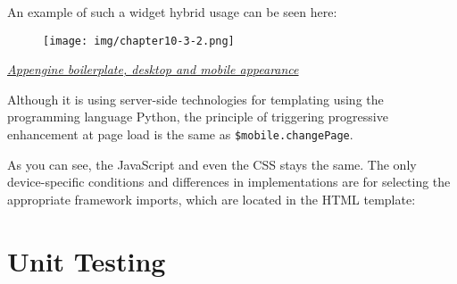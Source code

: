 \documentclass[9pt]{book}
\newenvironment{Shaded}{}{}
\newcommand{\KeywordTok}[1]{\textcolor[rgb]{0.00,0.44,0.13}{\textbf{{#1}}}}
\newcommand{\StringTok}[1]{\textcolor[rgb]{0.25,0.44,0.63}{{#1}}}
\newcommand{\OtherTok}[1]{\textcolor[rgb]{0.00,0.44,0.13}{{#1}}}
\newcommand{\NormalTok}[1]{{#1}}
\begin{document}
An example of such a widget hybrid usage can be seen here:

\begin{figure}[htbp]
\centering
\texttt{[image: img/chapter10-3-2.png]}
\end{figure}

\emph{\href{http://appengine.beecoss.com}{Appengine boilerplate, desktop
and mobile appearance}}

Although it is using server-side technologies for templating using the
programming language Python, the principle of triggering progressive
enhancement at page load is the same as \texttt{\$mobile.changePage}.

As you can see, the JavaScript and even the CSS stays the same. The only
device-specific conditions and differences in implementations are for
selecting the appropriate framework imports, which are located in the
HTML template:

\begin{Shaded}
\end{Shaded}

\section{Unit Testing}\label{unit-testing}
\end{document}
